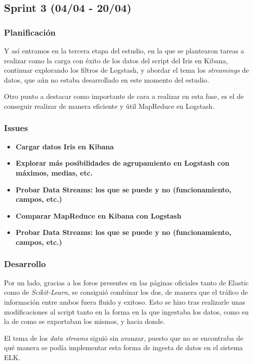 \subsection{Sprint 3 (04/04  - 20/04)}
\subsubsection{Planificación}
Y así entramos en la tercera etapa del estudio, en la que se plantearon tareas a realizar como la carga con éxito de los datos del script del Iris en Kibana, continuar explorando los filtros de Logstash, y abordar el tema los \textit{streamings} de datos, que aún no estaba desarrollado en este momento del estudio.

Otro punto a destacar como importante de cara a realizar en esta fase, es el de conseguir realizar de manera eficiente y útil  MapReduce en Logstash.

\subsubsection{Issues}
\begin{itemize}
    \item \textbf{Cargar datos Iris en Kibana}
    \item \textbf{Explorar más posibilidades de agrupamiento en Logstash con máximos, medias, etc.}
    \item \textbf{Probar Data Streams: los que se puede y no (funcionamiento, campos, etc.)} 
    \item \textbf{Comparar MapReduce en Kibana con Logstash}
    \item \textbf{Probar Data Streams: los que se puede y no (funcionamiento, campos, etc.)}
\end{itemize}

\subsubsection{Desarrollo}
Por un lado, gracias a los foros presentes en las páginas oficiales tanto de Elastic como de \textit{Scikit-Learn}, se consiguió combinar los dos, de manera que el tráfico de información entre ambos fuera fluido y exitoso. Esto se hizo tras realizarle unas modificaciones al script tanto en la forma en la que ingestaba los datos, como en la de como se exportaban los mismos, y hacia donde.

El tema de los \textit{data streams} siguió sin avanzar, puesto que no se encontraba de qué manera se podía implementar esta forma de ingesta de datos en el sistema ELK. 

